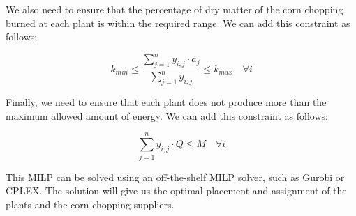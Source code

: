 \documentclass{article}
\begin{document}
We also need to ensure that the percentage of dry matter of the corn chopping burned at each plant is within the required range. We can add this constraint as follows:

$$k_{min} \leq \frac{\sum_{j=1}^n y_{i,j} \cdot a_j}{\sum_{j=1}^n y_{i,j}} \leq k_{max} \quad \forall i$$

Finally, we need to ensure that each plant does not produce more than the maximum allowed amount of energy. We can add this constraint as follows:

$$\sum_{j=1}^n y_{i,j} \cdot Q \leq M \quad \forall i$$

This MILP can be solved using an off-the-shelf MILP solver, such as Gurobi or CPLEX. The solution will give us the optimal placement and assignment of the plants and the corn chopping suppliers.
\end{document}
